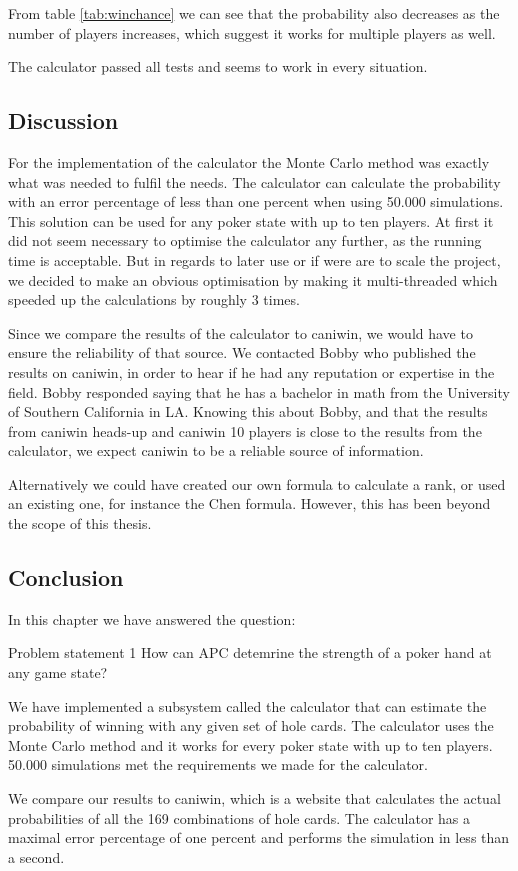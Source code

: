 From table \ref{tab:winchance} we can see that the probability also decreases as the number of players increases, which suggest it works for multiple players as well.

The calculator passed all tests and seems to work in every situation. 

\subsection{Discussion}
For the implementation of the calculator the Monte Carlo method was exactly what was needed to fulfil the needs. The calculator can calculate the probability with an error percentage of less than one percent when using 50.000 simulations. This solution can be used for any poker state with up to ten players. At first it did not seem necessary to optimise the calculator any further, as the running time is acceptable. But in regards to later use or if were are to scale the project, we decided to make an obvious optimisation by making it multi-threaded which speeded up the calculations by roughly 3 times.	

Since we compare the results of the calculator to caniwin, we would have to ensure the reliability of that source. We contacted Bobby who published the results on caniwin, in order to hear if he had any reputation or expertise in the field. Bobby responded saying that he has a bachelor in math from the University of Southern California in LA. Knowing this about Bobby, and that the results from caniwin heads-up and caniwin 10 players is close to the results from the calculator, we expect caniwin to be a reliable source of information.

Alternatively we could have created our own formula to calculate a rank, or used an existing one, for instance the Chen formula. However, this has been beyond the scope of this thesis.

\subsection{Conclusion}
In this chapter we have answered the question:
\vspace{4mm}
\begin{statementBox2}{Problem statement 1}
How can APC detemrine the strength of a poker hand at any game state?
\end{statementBox2}
\vspace{4mm}

We have implemented a subsystem called the calculator that can estimate the probability of winning with any given set of hole cards. The calculator uses the Monte Carlo method and it works for every poker state with up to ten players. 50.000 simulations  met the requirements we made for the calculator.   

We compare our results to caniwin, which is a website that calculates the actual probabilities of all the 169 combinations of hole cards. The calculator has a maximal error percentage of one percent and performs the simulation in less than a second.
